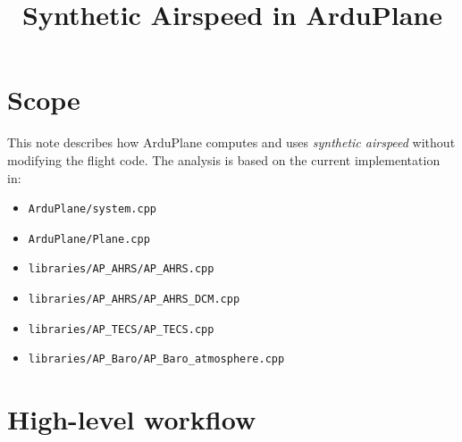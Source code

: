 \documentclass[11pt]{article}
\title{Synthetic Airspeed in ArduPlane}
\date{}
\begin{document}
\maketitle

\section{Scope}

This note describes how ArduPlane computes and uses \emph{synthetic airspeed} without modifying the flight code.
The analysis is based on the current implementation in:
\begin{itemize}
    \item \texttt{ArduPlane/system.cpp}
    \item \texttt{ArduPlane/Plane.cpp}
    \item \texttt{libraries/AP\_AHRS/AP\_AHRS.cpp}
    \item \texttt{libraries/AP\_AHRS/AP\_AHRS\_DCM.cpp}
    \item \texttt{libraries/AP\_TECS/AP\_TECS.cpp}
    \item \texttt{libraries/AP\_Baro/AP\_Baro\_atmosphere.cpp}
\end{itemize}

\section{High-level workflow}
\end{document}
